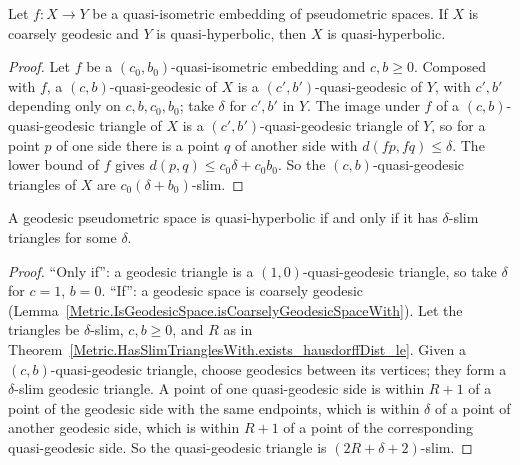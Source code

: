 \begin{lemma}
  \label{Metric.IsQuasiIsometricEmbedding.isQuasiHyperbolic}
  Let $f \colon X \to Y$ be a quasi-isometric embedding of pseudometric spaces. If $X$ is coarsely
  geodesic and $Y$ is quasi-hyperbolic, then $X$ is quasi-hyperbolic.
\end{lemma}
\begin{proof}
  Let $f$ be a $(c_0, b_0)$-quasi-isometric embedding and $c, b \ge 0$. Composed with $f$, a
  $(c, b)$-quasi-geodesic of $X$ is a $(c', b')$-quasi-geodesic of $Y$, with $c', b'$ depending
  only on $c, b, c_0, b_0$; take $\delta$ for $c', b'$ in $Y$. The image under $f$ of a
  $(c, b)$-quasi-geodesic triangle of $X$ is a $(c', b')$-quasi-geodesic triangle of $Y$, so for a
  point $p$ of one side there is a point $q$ of another side with $d(f p, f q) \le \delta$. The
  lower bound of $f$ gives $d(p, q) \le c_0 \delta + c_0 b_0$. So the $(c, b)$-quasi-geodesic
  triangles of $X$ are $c_0(\delta + b_0)$-slim.
\end{proof}

\begin{theorem}
  \label{Metric.isQuasiHyperbolic_iff_exists_hasSlimTrianglesWith}
  A geodesic pseudometric space is quasi-hyperbolic if and only if it has $\delta$-slim triangles
  for some $\delta$.
\end{theorem}
\begin{proof}
  ``Only if'': a geodesic triangle is a $(1, 0)$-quasi-geodesic triangle, so take $\delta$ for $c =
  1$, $b = 0$. ``If'': a geodesic space is coarsely geodesic
  (Lemma~\ref{Metric.IsGeodesicSpace.isCoarselyGeodesicSpaceWith}). Let the triangles be
  $\delta$-slim, $c, b \ge 0$, and $R$ as in
  Theorem~\ref{Metric.HasSlimTrianglesWith.exists_hausdorffDist_le}. Given a $(c,
  b)$-quasi-geodesic triangle, choose geodesics between its vertices; they form a $\delta$-slim
  geodesic triangle. A point of one quasi-geodesic side is within $R + 1$ of a point of the
  geodesic side with the same endpoints, which is within $\delta$ of a point of another geodesic
  side, which is within $R + 1$ of a point of the corresponding quasi-geodesic side. So the
  quasi-geodesic triangle is $(2R + \delta + 2)$-slim.
\end{proof}

